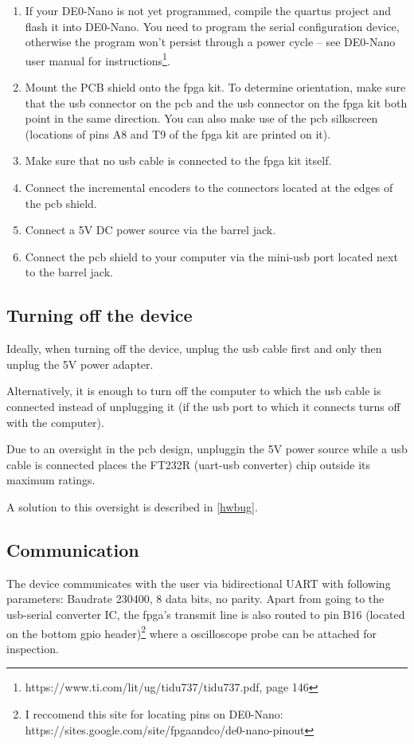 \documentclass[twoside]{article}
\begin{document}
\begin{enumerate}
\item If your DE0-Nano is not yet programmed, compile the quartus project and flash it into DE0-Nano. You need to program the serial configuration device, otherwise the program won't persist through a power cycle -- see DE0-Nano user manual for instructions\footnote{https://www.ti.com/lit/ug/tidu737/tidu737.pdf, page 146}.
\item Mount the PCB shield onto the fpga kit. To determine orientation, make sure that the usb connector on the pcb and the usb connector on the fpga kit both point in the same direction. You can also make use of the pcb silkscreen (locations of pins A8 and T9 of the fpga kit are printed on it).
\item Make sure that no usb cable is connected to the fpga kit itself.
\item Connect the incremental encoders to the connectors located at the edges of the pcb shield.
\item Connect a 5V DC power source via the barrel jack.
\item Connect the pcb shield to your computer via the mini-usb port located next to the barrel jack.
\end{enumerate}

\subsection{Turning off the device}
\label{turnoff}

Ideally, when turning off the device, unplug the usb cable first and only then unplug the 5V power adapter.

Alternatively, it is enough to turn off the computer to which the usb cable is connected instead of unplugging it (if the usb port to which it connects turns off with the computer).

Due to an oversight in the pcb design, unpluggin the 5V power source while a usb cable is connected places the FT232R (uart-usb converter) chip outside its maximum ratings. 

A solution to this oversight is described in \ref{hwbug}.

\newpage{}

\subsection{Communication}

\par The device communicates with the user via bidirectional UART with following parameters: Baudrate 230400, 8 data bits, no parity. Apart from going to the usb-serial converter IC, the fpga's transmit line is also routed to pin B16 (located on the bottom gpio header)\footnote{I reccomend this site for locating pins on DE0-Nano: https://sites.google.com/site/fpgaandco/de0-nano-pinout} where a oscilloscope probe can be attached for inspection.
\end{document}
